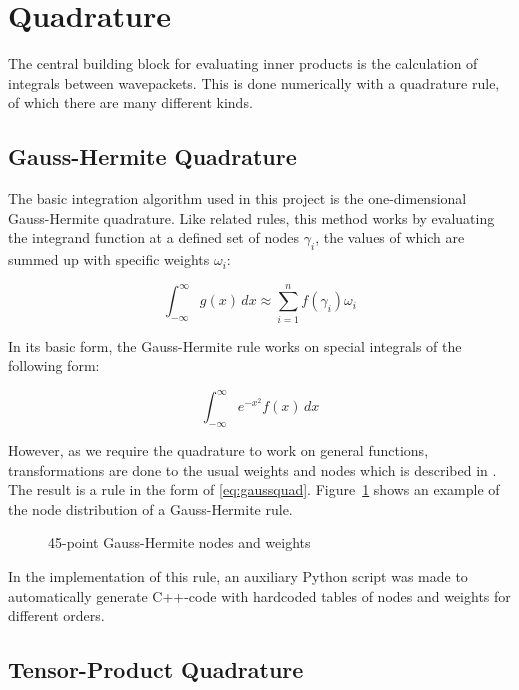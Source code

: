 \section{Quadrature}

The central building block for evaluating inner products is the calculation of
integrals between wavepackets.
This is done numerically with a quadrature rule, of which there are many
different kinds.


\subsection{Gauss-Hermite Quadrature}
\label{subsec:ghquad}

The basic integration algorithm used in this project is the one-dimensional
Gauss-Hermite quadrature.
Like related rules, this method works by evaluating the integrand function at a
defined set of nodes $\gamma_i$, the values of which are summed up with specific
weights $\omega_i$:

\begin{equation}
  \label{eq:gaussquad}
  \int_{-\infty}^{\infty} g(x) \, dx \approx \sum_{i=1}^{n} f(\gamma_i) \omega_i
\end{equation}

In its basic form, the Gauss-Hermite rule works on special integrals of the
following form:

\begin{equation}
  \int_{-\infty}^{\infty} e^{-x^2} f(x) \, dx
\end{equation}

However, as we require the quadrature to work on general functions,
transformations are done to the usual weights and nodes which is described in
\cite{B_master_thesis}.
The result is a rule in the form of \eqref{eq:gaussquad}.
Figure~\ref{fig:ghexample} shows an example of the node distribution of a
Gauss-Hermite rule.

\begin{figure}
  \center
  
  \caption{45-point Gauss-Hermite nodes and weights}
  \label{fig:ghexample}
\end{figure}

In the implementation of this rule, an auxiliary Python script was made to
automatically generate C++-code with hardcoded tables of nodes and weights for
different orders.


\subsection{Tensor-Product Quadrature}
\label{subsec:tpquad}

